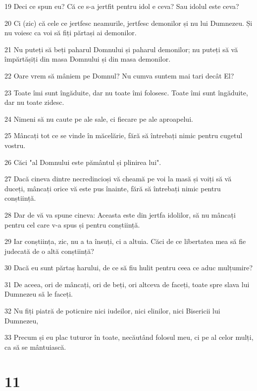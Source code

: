 \par 19 Deci ce spun eu? Că ce s-a jertfit pentru idol e ceva? Sau idolul este ceva?
\par 20 Ci (zic) că cele ce jertfesc neamurile, jertfesc demonilor și nu lui Dumnezeu. Și nu voiesc ca voi să fiți părtași ai demonilor.
\par 21 Nu puteți să beți paharul Domnului și paharul demonilor; nu puteți să vă împărtășiți din masa Domnului și din masa demonilor.
\par 22 Oare vrem să mâniem pe Domnul? Nu cumva suntem mai tari decât El?
\par 23 Toate îmi sunt îngăduite, dar nu toate îmi folosesc. Toate îmi sunt îngăduite, dar nu toate zidesc.
\par 24 Nimeni să nu caute pe ale sale, ci fiecare pe ale aproapelui.
\par 25 Mâncați tot ce se vinde în măcelărie, fără să întrebați nimic pentru cugetul vostru.
\par 26 Căci "al Domnului este pământul și plinirea lui".
\par 27 Dacă cineva dintre necredincioși vă cheamă pe voi la masă și voiți să vă duceți, mâncați orice vă este pus înainte, fără să întrebați nimic pentru conștiință.
\par 28 Dar de vă va spune cineva: Aceasta este din jertfa idolilor, să nu mâncați pentru cel care v-a spus și pentru conștiință.
\par 29 Iar conștiința, zic, nu a ta însuți, ci a altuia. Căci de ce libertatea mea să fie judecată de o altă conștiință?
\par 30 Dacă eu sunt părtaș harului, de ce să fiu hulit pentru ceea ce aduc mulțumire?
\par 31 De aceea, ori de mâncați, ori de beți, ori altceva de faceți, toate spre slava lui Dumnezeu să le faceți.
\par 32 Nu fiți piatră de poticnire nici iudeilor, nici elinilor, nici Bisericii lui Dumnezeu,
\par 33 Precum și eu plac tuturor în toate, necăutând folosul meu, ci pe al celor mulți, ca să se mântuiască.

\chapter{11}

